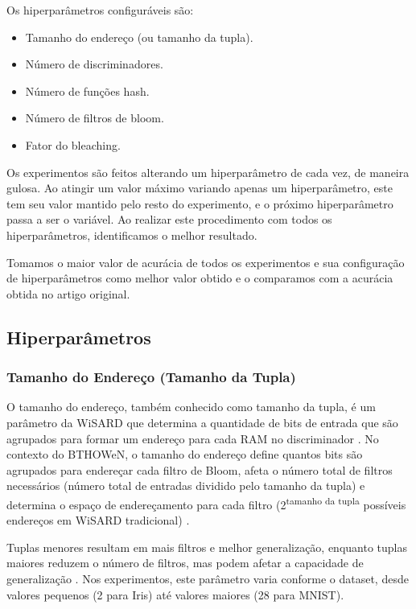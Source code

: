 \documentclass{article}
\begin{document}
Os hiperparâmetros configuráveis são:

\begin{itemize}
    \item Tamanho do endereço (ou tamanho da tupla).
    \item Número de discriminadores.
    \item Número de funções hash.
    \item Número de filtros de bloom.
    \item Fator do bleaching.
\end{itemize}

Os experimentos são feitos alterando um hiperparâmetro de cada vez, de maneira gulosa. Ao atingir um valor máximo variando apenas um hiperparâmetro, este tem seu valor mantido pelo resto do experimento, e o próximo hiperparâmetro passa a ser o variável. Ao realizar este procedimento com todos os hiperparâmetros, identificamos o melhor resultado.

Tomamos o maior valor de acurácia de todos os experimentos e sua configuração de hiperparâmetros como melhor valor obtido e o comparamos com a acurácia obtida no artigo original.

\subsection{Hiperparâmetros}

\subsubsection{Tamanho do Endereço (Tamanho da Tupla)}

O tamanho do endereço, também conhecido como tamanho da tupla, é um parâmetro da WiSARD que determina a quantidade de bits de entrada que são agrupados para formar um endereço para cada RAM no discriminador \cite{lima2020wisardpkg}. 
No contexto do BTHOWeN, o tamanho do endereço define quantos bits são agrupados para endereçar cada filtro de Bloom, afeta o número total de filtros necessários (número total de entradas dividido pelo tamanho da tupla) e determina o espaço de endereçamento para cada filtro (2\textsuperscript{tamanho da tupla} possíveis endereços em WiSARD tradicional) \cite{santiago2023}.

Tuplas menores resultam em mais filtros e melhor generalização, enquanto tuplas maiores reduzem o número de filtros, mas podem afetar a capacidade de generalização \cite{santiago2020}. Nos experimentos, este parâmetro varia conforme o dataset, desde valores pequenos (2 para Iris) até valores maiores (28 para MNIST).
\end{document}
